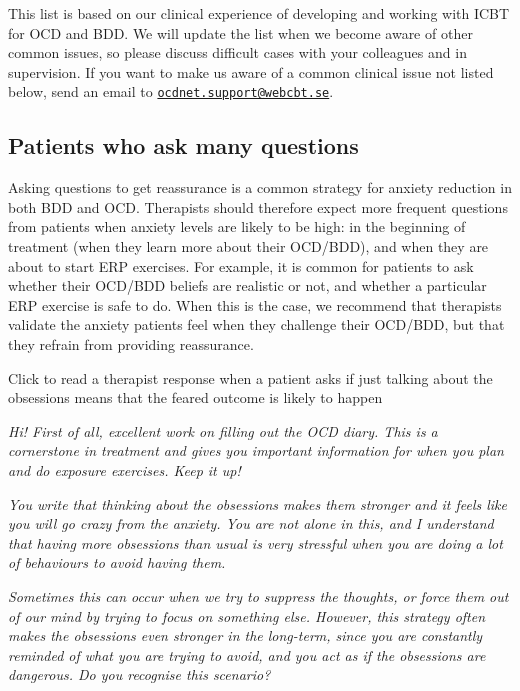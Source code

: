 \documentclass[]{book}
\begin{document}
This list is based on our clinical experience of developing and working with ICBT for OCD and BDD. We will update the list when we become aware of other common issues, so please discuss difficult cases with your colleagues and in supervision. If you want to make us aware of a common clinical issue not listed below, send an email to \href{mailto:ocdnet.support@webcbt.se}{\nolinkurl{ocdnet.support@webcbt.se}}.

\hypertarget{patients-who-ask-many-questions}{%
\subsection{Patients who ask many questions}\label{patients-who-ask-many-questions}}

Asking questions to get reassurance is a common strategy for anxiety reduction in both BDD and OCD. Therapists should therefore expect more frequent questions from patients when anxiety levels are likely to be high: in the beginning of treatment (when they learn more about their OCD/BDD), and when they are about to start ERP exercises. For example, it is common for patients to ask whether their OCD/BDD beliefs are realistic or not, and whether a particular ERP exercise is safe to do. When this is the case, we recommend that therapists validate the anxiety patients feel when they challenge their OCD/BDD, but that they refrain from providing reassurance.

 Click to read a therapist response when a patient asks if just talking about the obsessions means that the feared outcome is likely to happen

\emph{Hi! First of all, excellent work on filling out the OCD diary. This is a cornerstone in treatment and gives you important information for when you plan and do exposure exercises. Keep it up!}

\emph{You write that thinking about the obsessions makes them stronger and it feels like you will go crazy from the anxiety. You are not alone in this, and I understand that having more obsessions than usual is very stressful when you are doing a lot of behaviours to avoid having them.}

\emph{Sometimes this can occur when we try to suppress the thoughts, or force them out of our mind by trying to focus on something else. However, this strategy often makes the obsessions even stronger in the long-term, since you are constantly reminded of what you are trying to avoid, and you act as if the obsessions are dangerous. Do you recognise this scenario?}
\end{document}
